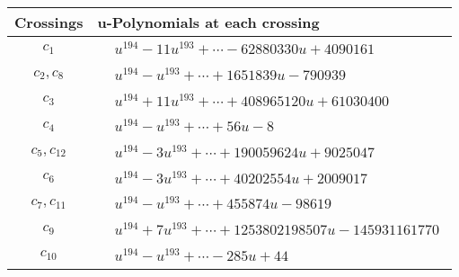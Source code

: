 \documentclass[1p]{elsarticle_modified}
\theoremstyle{definition}
\begin{document}
\begin{tabular}{m{50pt}|m{274pt}}
Crossings & \hspace{64pt}u-Polynomials at each crossing \\
\hline $$\begin{aligned}c_{1}\end{aligned}$$&$\begin{aligned}
&u^{194}-11 u^{193}+\cdots-62880330 u+4090161
\end{aligned}$\\
\hline $$\begin{aligned}c_{2},c_{8}\end{aligned}$$&$\begin{aligned}
&u^{194}- u^{193}+\cdots+1651839 u-790939
\end{aligned}$\\
\hline $$\begin{aligned}c_{3}\end{aligned}$$&$\begin{aligned}
&u^{194}+11 u^{193}+\cdots+408965120 u+61030400
\end{aligned}$\\
\hline $$\begin{aligned}c_{4}\end{aligned}$$&$\begin{aligned}
&u^{194}- u^{193}+\cdots+56 u-8
\end{aligned}$\\
\hline $$\begin{aligned}c_{5},c_{12}\end{aligned}$$&$\begin{aligned}
&u^{194}-3 u^{193}+\cdots+190059624 u+9025047
\end{aligned}$\\
\hline $$\begin{aligned}c_{6}\end{aligned}$$&$\begin{aligned}
&u^{194}-3 u^{193}+\cdots+40202554 u+2009017
\end{aligned}$\\
\hline $$\begin{aligned}c_{7},c_{11}\end{aligned}$$&$\begin{aligned}
&u^{194}- u^{193}+\cdots+455874 u-98619
\end{aligned}$\\
\hline $$\begin{aligned}c_{9}\end{aligned}$$&$\begin{aligned}
&u^{194}+7 u^{193}+\cdots+1253802198507 u-145931161770
\end{aligned}$\\
\hline $$\begin{aligned}c_{10}\end{aligned}$$&$\begin{aligned}
&u^{194}- u^{193}+\cdots-285 u+44
\end{aligned}$\\
\hline
\end{tabular}\\~\\
\end{document}
